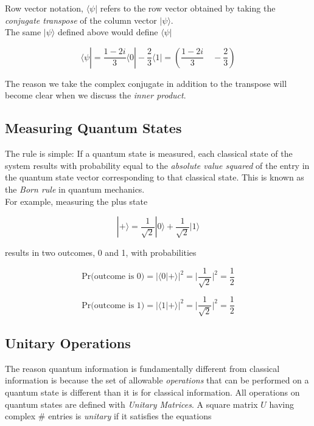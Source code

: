\documentclass[svgnames]{article}     %
\begin{document}
Row vector notation, $\langle \psi |$ refers to the row vector obtained by
taking the  \textit{conjugate transpose} of the column vector $|\psi\rangle$.\\

The same $|\psi\rangle$ defined above would define $\langle \psi |$ 

\[
\langle \psi | = \frac{1-2i}{3}\langle 0| - \frac{2}{3}\langle 1| = \left(\frac{1-2i}{3} \quad -\frac{2}{3}\right)
\] \vspace{5px}

The reason we take the complex conjugate in addition to the transpose will
become clear when we discuss the \textit{inner product}.


\subsection{Measuring Quantum States}

The rule is simple: If a quantum state is measured, each classical state of the
system results with probability equal to the \textit{absolute value squared} of
the entry in the quantum state vector corresponding to that classical state.
This is known as the \textit{Born rule} in quantum mechanics. \\

For example, measuring the plus state 

\[
  |+\rangle = \frac{1}{\sqrt{2}}|0\rangle + \frac{1}{\sqrt{2}}|1\rangle
\] \vspace{5px}

results in two outcomes, 0 and 1, with probabilities 

\[
  \text{Pr(outcome is 0)} = |\langle 0 | +\rangle |^2
  = \Big|\frac{1}{\sqrt{2}}\Big|^2 = \frac{1}{2}
\] \vspace{5px}

\[
  \text{Pr(outcome is 1)} = |\langle 1 | + \rangle|^2
  = \Big|\frac{1}{\sqrt{2}}\Big|^2 = \frac{1}{2}
\] \vspace{5px}

\subsection{Unitary Operations}

The reason quantum information is fundamentally different from classical
information is because the set of allowable \textit{operations} that can be
performed on a quantum state is different than it is for classical information.
All operations on quantum states are defined with \textit{Unitary Matrices}.
A square matrix $U$ having complex \# entries is \textit{unitary} if it
satisfies the equations 
\end{document}
